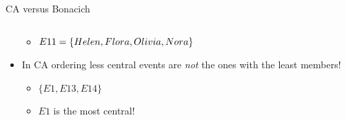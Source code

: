 \documentclass[
  ignorenonframetext,
]{beamer}
\providecommand{\tightlist}{%
  \setlength{\itemsep}{0pt}\setlength{\parskip}{0pt}}\usepackage{longtable,booktabs,array}
\begin{document}
\begin{frame}{CA versus Bonacich}
\begin{columns}[T]
\begin{column}{0.5\textwidth}
\begin{itemize}
  \begin{itemize}
  \tightlist
  \item
    \(E11 = \{Helen, Flora, Olivia, \\ Nora\}\)
  \end{itemize}
\item
  In CA ordering less central events are \emph{not} the ones with the
  least members!

  \begin{itemize}
  \tightlist
  \item
    \(\{E1, E13, E14\}\)
  \item
    \(E1\) is the most central!
  \end{itemize}
\end{itemize}
\end{column}
\end{columns}
\end{frame}
\end{document}
